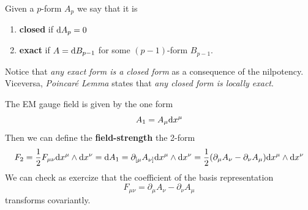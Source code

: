 \documentclass[../main/main.tex]{subfiles}
\begin{document}
\begin{definition}{}
Given a $p$-form $A_p$ we say that it is
\begin{enumerate}
\item \textbf{closed} if $\textup{d} A_p=0$
\item \textbf{exact} if $A=\textup{d} B_{p-1}$ for some $(p-1)$-form $B_{p-1}$.
\end{enumerate}
Notice that \emph{any exact form is a closed form} as a consequence of the nilpotency. Viceversa, \emph{Poincaré Lemma} states that \emph{any closed form is locally exact}. 

\end{definition}

\begin{example}
The EM gauge field is given by the one form
\[A_1=A_\mu\textup{d} x^\mu\]
Then we can define the \textbf{field-strength} the 2-form
\[F_2=\frac12F_{\mu\nu}\textup{d} x^\mu\wedge\textup{d} x^\nu=\textup{d} A_1=\partial_{[\mu}A_{\nu]}\textup{d} x^\mu\wedge\textup{d} x^\nu=\frac12(\partial_\mu A_\nu-\partial_\nu A_\mu)\textup{d} x^\mu\wedge\textup{d} x^\nu\]
We can check as exercize that the coefficient of the basis representation
\[F_{\mu\nu}=\partial_\mu A_\nu-\partial_\nu A_\mu\]
transforms covariantly. 

\end{example}
\end{document}
